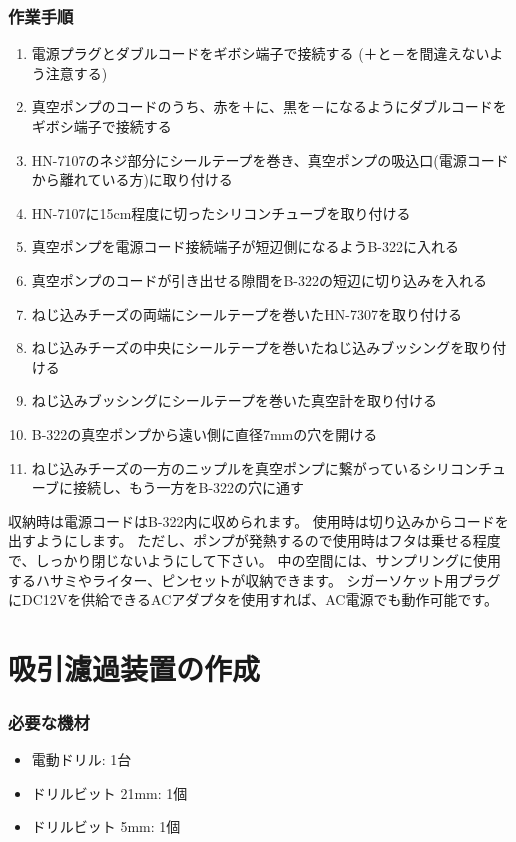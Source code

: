 \documentclass[titlepage,10pt,a4paper,uplatex]{jsbook}
\begin{document}
\subsubsection{作業手順}
\begin{enumerate}
\item 電源プラグとダブルコードをギボシ端子で接続する (＋と－を間違えないよう注意する)
\item 真空ポンプのコードのうち、赤を＋に、黒を－になるようにダブルコードをギボシ端子で接続する
\item HN-7107のネジ部分にシールテープを巻き、真空ポンプの吸込口(電源コードから離れている方)に取り付ける
\item HN-7107に15cm程度に切ったシリコンチューブを取り付ける
\item 真空ポンプを電源コード接続端子が短辺側になるようB-322に入れる
\item 真空ポンプのコードが引き出せる隙間をB-322の短辺に切り込みを入れる
\item ねじ込みチーズの両端にシールテープを巻いたHN-7307を取り付ける
\item ねじ込みチーズの中央にシールテープを巻いたねじ込みブッシングを取り付ける
\item ねじ込みブッシングにシールテープを巻いた真空計を取り付ける
\item B-322の真空ポンプから遠い側に直径7mmの穴を開ける
\item ねじ込みチーズの一方のニップルを真空ポンプに繋がっているシリコンチューブに接続し、もう一方をB-322の穴に通す
\end{enumerate}

収納時は電源コードはB-322内に収められます。
使用時は切り込みからコードを出すようにします。
ただし、ポンプが発熱するので使用時はフタは乗せる程度で、しっかり閉じないようにして下さい。
中の空間には、サンプリングに使用するハサミやライター、ピンセットが収納できます。
シガーソケット用プラグにDC12Vを供給できるACアダプタを使用すれば、AC電源でも動作可能です。

\section{吸引濾過装置の作成}\label{makingfilteringunit}

\subsubsection{必要な機材}
\begin{itemize}
\item 電動ドリル: 1台
\item ドリルビット 21mm: 1個
\item ドリルビット 5mm: 1個
\end{itemize}
\end{document}

